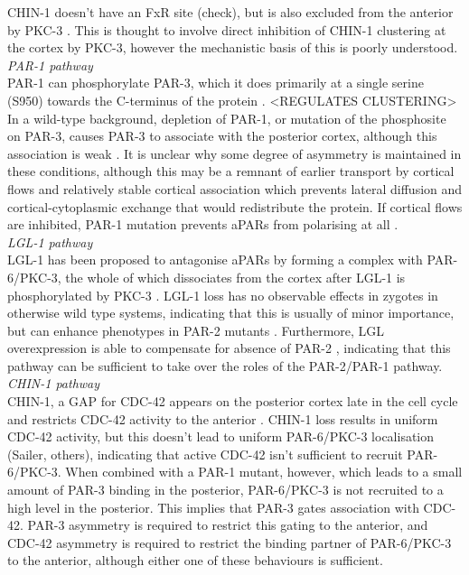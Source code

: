 \documentclass[12pt]{"article"}
\begin{document}
CHIN-1 doesn’t have an FxR site (check), but is also excluded from the anterior by PKC-3 \citep{Sailer2015}. This is thought to involve direct inhibition of CHIN-1 clustering at the cortex by PKC-3, however the mechanistic basis of this is poorly understood.\\

\textit{PAR-1 pathway} \\

PAR-1 can phosphorylate PAR-3, which it does primarily at a single serine (S950) towards the C-terminus of the protein \citep{Motegi2011}. <REGULATES CLUSTERING> In a wild-type background, depletion of PAR-1, or mutation of the phosphosite on PAR-3, causes PAR-3 to associate with the posterior cortex, although this association is weak \citep{Sailer2015}. It is unclear why some degree of asymmetry is maintained in these conditions, although this may be a remnant of earlier transport by cortical flows and relatively stable cortical association which prevents lateral diffusion and cortical-cytoplasmic exchange that would redistribute the protein. If cortical flows are inhibited, PAR-1 mutation prevents aPARs from polarising at all \citep{Motegi2011}.\\

\textit{LGL-1 pathway}\\

LGL-1 has been proposed to antagonise aPARs by forming a complex with PAR-6/PKC-3, the whole of which dissociates from the cortex after LGL-1 is phosphorylated by PKC-3 \citep{Hoege2010}. LGL-1 loss has no observable effects in zygotes in otherwise wild type systems, indicating that this is usually of minor importance, but can enhance phenotypes in PAR-2 mutants \citep{Beatty2010}. Furthermore, LGL overexpression is able to compensate for absence of PAR-2 \citep{Hoege2010}, indicating that this pathway can be sufficient to take over the roles of the PAR-2/PAR-1 pathway.\\

\textit{CHIN-1 pathway}\\

CHIN-1, a GAP for CDC-42 appears on the posterior cortex late in the cell cycle and restricts CDC-42 activity to the anterior \citep{Kumfer2010} \citep{Beatty2013}\citep{Sailer2015}. CHIN-1 loss results in uniform CDC-42 activity, but this doesn’t lead to uniform PAR-6/PKC-3 localisation (Sailer, others), indicating that active CDC-42 isn’t sufficient to recruit PAR-6/PKC-3. When combined with a PAR-1 mutant, however, which leads to a small amount of PAR-3 binding in the posterior, PAR-6/PKC-3 is not recruited to a high level in the posterior. This implies that PAR-3 gates association with CDC-42. PAR-3 asymmetry is required to restrict this gating to the anterior, and CDC-42 asymmetry is required to restrict the binding partner of PAR-6/PKC-3 to the anterior, although either one of these behaviours is sufficient.\\
\end{document}
